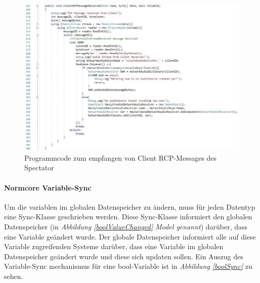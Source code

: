 \documentclass[a4paper,11pt]{article}%
\renewcommand{\\}{\vspace*{0.5\baselineskip} \newline}
\begin{document}
\begin{figure}[H]
		\begin{footnotesize}
		\centering
			\includegraphics[width=\textwidth]{Abbildungen/ClientRCPMessageReceived.jpg}
			
			\caption[Abbildung 1]{Programmcode zum empfangen von Client RCP-Messages des Spectator}
			\label{ClientRCPMessageReceived}
		\end{footnotesize}
	\end{figure}
	
\paragraph{Normcore Variable-Sync}
Um die variablen im globalen Datenspeicher zu ändern, muss für jeden Datentyp eine Sync-Klasse geschrieben werden. Diese Sync-Klasse informiert den globalen Datenspeicher (in \textit{Abbildung \ref{boolValueChanged} \dq{}Model\dq{} genannt}) darüber, dass eine Variable geändert wurde. Der globale Datenspeicher informiert alle auf diese Variable zugreifenden Systeme darüber, dass eine Variable im globalen Datenspeicher geändert wurde und diese sich updaten sollen. Ein Auszug des Variable-Sync mechanismus für eine bool-Variable ist in \textit{Abbildung \ref{boolSync}} zu sehen.
\end{document}
